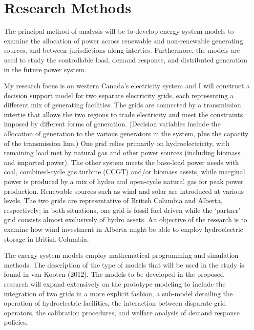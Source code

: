 \section{Research Methods }\label{research-methods}

The principal method of analysis will be to develop energy system models
to examine the allocation of power across renewable and non-renewable
generating sources, and between jurisdictions along interties.
Furthermore, the models are used to study the controllable load, demand
response, and distributed generation in the future power system.

My research focus is on western Canada's electricity system and I will
construct a decision support model for two separate electricity grids,
each representing a different mix of generating facilities. The grids
are connected by a transmission intertie that allows the two regions to
trade electricity and meet the constraints imposed by different forms of
generation. (Decision variables include the allocation of generation to
the various generators in the system, plus the capacity of the
transmission line.) One grid relies primarily on hydroelectricity, with
remaining load met by natural gas and other power sources (including
biomass and imported power). The other system meets the base-load power
needs with coal, combined-cycle gas turbine (CCGT) and/or biomass
assets, while marginal power is produced by a mix of hydro and
open-cycle natural gas for peak power production. Renewable sources such
as wind and solar are introduced at various levels. The two grids are
representative of British Columbia and Alberta, respectively; in both
situations, one grid is fossil fuel driven while the `partner' grid
consists almost exclusively of hydro assets. An objective of the
research is to examine how wind investment in Alberta might be able to
employ hydroelectric storage in British Columbia.

The energy system models employ mathematical programming and simulation
methods. The description of the type of models that will be used in the
study is found in van Kooten (2012). The models to be developed in the
proposed research will expand extensively on the prototype modeling to
include the integration of two grids in a more explicit fashion, a
sub-model detailing the operation of hydroelectric facilities, the
interaction between disparate grid operators, the calibration
procedures, and welfare analysis of demand response policies.

